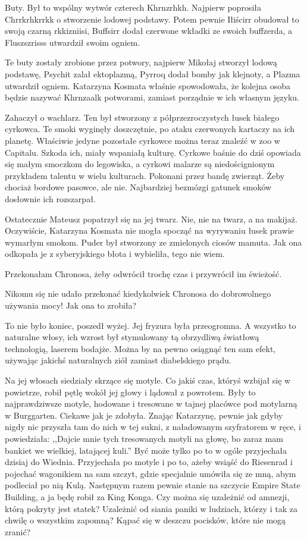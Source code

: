 Buty. Był to wspólny wytwór czterech Khrnzrhkh.
Najpierw poprosiła Chrrkrhkrrkk o stworzenie lodowej podstawy.
Potem pewnie Iłiścirr obudował to swoją czarną rkkizniisi, Buffsirr dodał czerwone wkładki ze swoich buffzerda, a Fluszszrisss utwardził swoim ogniem.

\ds{} Te buty zostały zrobione przez potwory, najpierw Mikołaj stworzył lodową podstawę, Psychit zalał ektoplazmą, Pyrroq dodał bomby jak klejnoty, a Plazma utwardził ogniem. \dm{}
Katarzyna Kosmata właśnie spowodowała, że kolejna osoba będzie nazywać Khrnzaalk potworami, zamiast porządnie w ich własnym języku. \de{}

Zahaczył o wachlarz.
Ten był stworzony z półprzezroczystych łusek białego cyrkowca.
Te smoki wyginęły doszczętnie, po ataku czerwonych kartaczy na ich planetę.
Właściwie jedyne pozostałe cyrkowce można teraz znaleźć w zoo w Capitalu.
Szkoda ich, miały wspaniałą kulturę.
Cyrkowe baśnie do dziś opowiada się małym smoczkom do legowiska, a cyrkowi malarze są niedoścignionym przykładem talentu w wielu kulturach.
Pokonani przez bandę zwierząt. Żeby chociaż bordowe pasowce, ale nie. Najbardziej bezmózgi gatunek smoków dosłownie ich rozszarpał.

Ostatecznie Mateusz popatrzył się na jej twarz.
Nie, nie na twarz, a na makijaż.
Oczywiście, Katarzyna Kosmata nie mogła spocząć na wyrywaniu łusek prawie wymarłym smokom.
Puder był stworzony ze zmielonych ciosów mamuta.
Jak ona odkopała je z syberyjskiego błota i wybieliła, tego nie wiem.

\ds{} Przekonałam Chronosa, żeby odwrócił trochę czas i przywrócił im świeżość. \de{}

Nikomu się nie udało przekonać kiedykolwiek Chronosa do dobrowolnego używania mocy! Jak ona to zrobiła?

To nie było koniec, poszedł wyżej.
Jej fryzura była przeogromna. A wszystko to naturalne włosy, ich wzrost był stymulowany tą obrzydliwą światłową technologią, laserem bodajże.
Można by na pewno osiągnąć ten sam efekt, używając jakichś naturalnych ziół zamiast diabelskiego prądu.

Na jej włosach siedziały skrzące się motyle. Co jakiś czas, któryś wzbijał się w powietrze, robił pętlę wokół jej głowy i lądował z powrotem.
Były to najprawdziwsze motyle, hodowane i tresowane w tajnej placówce pod motylarną w Burggarten.
Ciekawe jak je zdobyła. Znając Katarzynę, pewnie jak gdyby nigdy nic przyszła tam do nich w tej sukni, z naładowanym szyfratorem w ręce, i powiedziała:
,,Dajcie mnie tych tresowanych motyli na głowę, bo zaraz mam bankiet we wielkiej, latającej kuli.''
Być może tylko po to w ogóle przyjechała dzisiaj do Wiednia.
Przyjechała po motyle i po to, ażeby wsiąść do Riesenrad i pojechać wagonikiem na sam szczyt, gdzie specjalnie umówiła się ze mną, abym podleciał po nią Kulą.
Następnym razem pewnie stanie na szczycie Empire State Building, a ja będę robił za King Konga.
Czy można się uzależnić od amnezji, którą pokryty jest statek?
Uzależnić od siania paniki w ludziach, którzy i tak za chwilę o wszystkim zapomną?
Kąpać się w deszczu pocisków, które nie mogą zranić?

